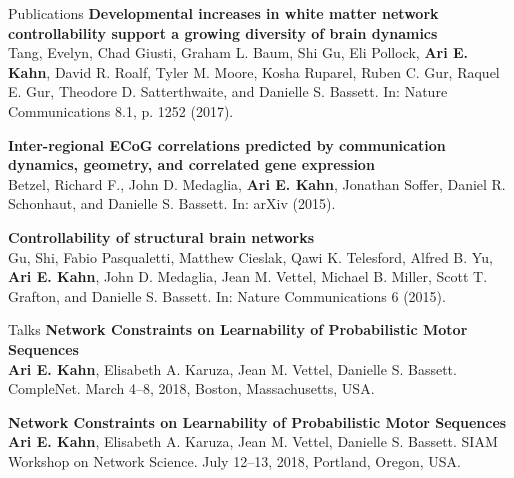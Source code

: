 \documentclass{resume} %
\begin{document}
\begin{rSection}{Publications}
\textbf{Developmental increases in white matter network controllability support a growing diversity of brain dynamics} \\
Tang, Evelyn, Chad Giusti, Graham L. Baum, Shi Gu, Eli Pollock, \textbf{Ari E. Kahn}, David R. Roalf, Tyler M. Moore, Kosha Ruparel, Ruben C. Gur, Raquel E. Gur, Theodore D. Satterthwaite, and Danielle S. Bassett. In: Nature Communications 8.1, p. 1252 (2017).



\textbf{Inter-regional ECoG correlations predicted by communication dynamics, geometry, and correlated gene expression} \\
Betzel, Richard F., John D. Medaglia, \textbf{Ari E. Kahn}, Jonathan Soffer, Daniel R. Schonhaut, and Danielle S. Bassett. In: arXiv (2015).

\textbf{Controllability of structural brain networks} \\
Gu, Shi, Fabio Pasqualetti, Matthew Cieslak, Qawi K. Telesford, Alfred B. Yu, \textbf{Ari E. Kahn}, John D. Medaglia, Jean M. Vettel, Michael B. Miller, Scott T. Grafton, and Danielle S. Bassett. In: Nature Communications 6 (2015).

\end{rSection}


\begin{rSection}{Talks}
\textbf{Network Constraints on Learnability of Probabilistic Motor Sequences} \\
\textbf{Ari E. Kahn}, Elisabeth A. Karuza, Jean M. Vettel, Danielle S. Bassett. CompleNet. March 4--8, 2018, Boston, Massachusetts, USA.

\textbf{Network Constraints on Learnability of Probabilistic Motor Sequences} \\
\textbf{Ari E. Kahn}, Elisabeth A. Karuza, Jean M. Vettel, Danielle S. Bassett. SIAM Workshop on Network Science. July 12--13, 2018, Portland, Oregon, USA.
\end{rSection}
\end{document}
